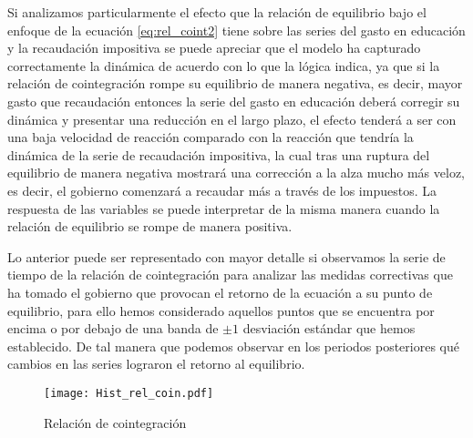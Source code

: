 Si analizamos particularmente el efecto que la relación de equilibrio bajo el enfoque de la ecuación \ref{eq:rel_coint2} tiene sobre las series del gasto en educación y la recaudación impositiva se puede apreciar que el modelo ha capturado correctamente la dinámica de acuerdo con lo que la lógica indica, ya que si la relación de cointegración rompe su equilibrio de manera negativa, es decir, mayor gasto que recaudación entonces la serie del gasto en educación deberá corregir su dinámica y presentar una reducción en el largo plazo, el efecto tenderá a ser con una baja velocidad de reacción comparado con la reacción que tendría la dinámica de la serie de recaudación impositiva, la cual tras una ruptura del equilibrio de manera negativa mostrará una corrección a la alza mucho más veloz, es decir, el gobierno comenzará a recaudar más a través de los impuestos. La respuesta de las variables se puede interpretar de la misma manera cuando la relación de equilibrio se rompe de manera positiva.

Lo anterior puede ser representado con mayor detalle si observamos la serie de tiempo de la relación de cointegración para analizar las medidas correctivas que ha tomado el gobierno que provocan el retorno de la ecuación a su punto de equilibrio, para ello hemos considerado aquellos puntos que se encuentra por encima o por debajo de una banda de $\pm 1$ desviación estándar que hemos establecido. De tal manera que podemos observar en los periodos posteriores qué cambios en las series lograron el retorno al equilibrio.

\begin{figure}[H]
\centering
\texttt{[image: Hist\_rel\_coin.pdf]}
\caption{Relación de cointegración}
\label{hist_rel_coint}
\end{figure}



